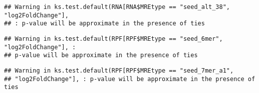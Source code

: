 \documentclass[
]{article}
\newenvironment{Shaded}{\begin{snugshade}}{\end{snugshade}}
\newcommand{\FunctionTok}[1]{\textcolor[rgb]{0.13,0.29,0.53}{\textbf{#1}}}
\newcommand{\NormalTok}[1]{#1}
\newcommand{\OtherTok}[1]{\textcolor[rgb]{0.56,0.35,0.01}{#1}}
\newcommand{\SpecialCharTok}[1]{\textcolor[rgb]{0.81,0.36,0.00}{\textbf{#1}}}
\newcommand{\StringTok}[1]{\textcolor[rgb]{0.31,0.60,0.02}{#1}}
\begin{document}
\begin{Shaded}
\end{Shaded}

\begin{verbatim}
## Warning in ks.test.default(RNA[RNA$MREtype == "seed_alt_38", "log2FoldChange"],
## : p-value will be approximate in the presence of ties
\end{verbatim}

\begin{Shaded}
\end{Shaded}

\begin{verbatim}
## Warning in ks.test.default(RPF[RPF$MREtype == "seed_6mer", "log2FoldChange"], :
## p-value will be approximate in the presence of ties
\end{verbatim}

\begin{Shaded}
\end{Shaded}

\begin{verbatim}
## Warning in ks.test.default(RPF[RPF$MREtype == "seed_7mer_a1",
## "log2FoldChange"], : p-value will be approximate in the presence of ties
\end{verbatim}
\end{document}
